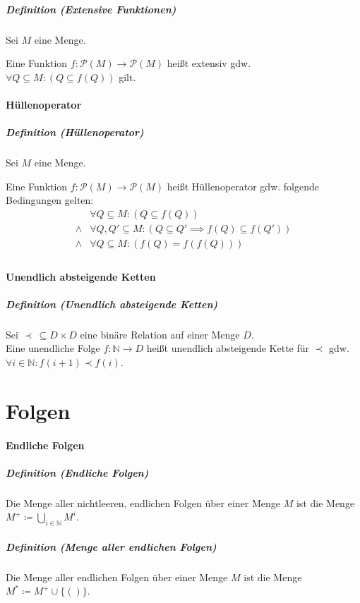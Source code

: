 \documentclass[a4paper, 11pt, accentcolor = tud3b]{tudreport}
\newcommand{\definition}[2]{\subparagraph{Definition (#1)} #2}
\begin{document}
				\definition{Extensive Funktionen}{
					Sei $ M $ eine Menge.
					
					Eine Funktion $ f : \mathcal{P}({M}) \rightarrow \mathcal{P}({M}) $ heißt extensiv gdw. $ \forall Q \subseteq M : (Q \subseteq f(Q)) $ gilt.
				}

		    \paragraph{Hüllenoperator}
				\definition{Hüllenoperator}{
					Sei $ M $ eine Menge.
					
					Eine Funktion $ f : \mathcal{P}(M) \rightarrow \mathcal{P}(M) $ heißt Hüllenoperator gdw. folgende Bedingungen gelten:
					\begin{align*}
						& \forall Q \subseteq M : (Q \subseteq f(Q)) \tag{Extensivität} \\
						\land & \forall Q, Q' \subseteq M : (Q \subseteq Q' \implies f(Q) \subseteq f(Q')) \tag{Monotonie} \\
						\land & \forall Q \subseteq M : (f(Q) = f(f(Q))) \tag{Idempotenz} \\
					\end{align*}
				}
		    
		    \paragraph{Unendlich absteigende Ketten}
			    \definition{Unendlich absteigende Ketten}{
				    Sei $ \prec \,\subseteq D \times D $ eine binäre Relation auf einer Menge $ D $. \\
				    Eine unendliche Folge $ f : \mathbb{N} \rightarrow D $ heißt unendlich absteigende Kette für $ \prec $ gdw. $ \forall i \in \mathbb{N} : f(i + 1) \prec f(i) $.
				}

    	\section{Folgen}
		    \paragraph{Endliche Folgen}
			    \definition{Endliche Folgen}{Die Menge aller nichtleeren, endlichen Folgen über einer Menge $ M $ ist die Menge $ M ^ + \coloneqq \bigcup _ { i \in \mathbb{N} } M ^ i $.}
			    
			    \definition{Menge aller endlichen Folgen}{Die Menge aller endlichen Folgen über einer Menge $ M $ ist die Menge $ M ^ * \coloneqq M ^ + \cup \{ () \} $.}
			    
\end{document}
